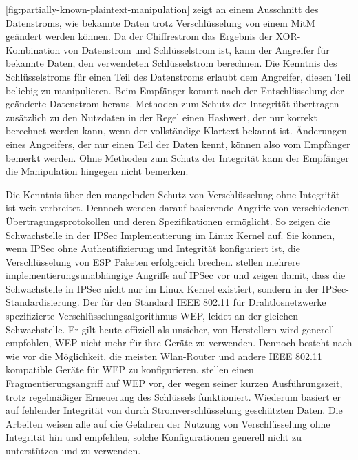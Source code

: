 \autoref{fig:partially-known-plaintext-manipulation} zeigt an einem Ausschnitt des Datenstroms, wie bekannte Daten trotz Verschlüsselung von einem \ac{MitM} geändert werden können. Da der Chiffrestrom das Ergebnis der \ac{XOR}-Kombination von Datenstrom und Schlüsselstrom ist, kann der Angreifer für bekannte Daten, den verwendeten Schlüsselstrom berechnen. Die Kenntnis des Schlüsselstroms für einen Teil des Datenstroms erlaubt dem Angreifer, diesen Teil beliebig zu manipulieren. Beim Empfänger kommt nach der Entschlüsselung der geänderte Datenstrom heraus. Methoden zum Schutz der Integrität übertragen zusätzlich zu den Nutzdaten in der Regel einen Hashwert, der nur korrekt berechnet werden kann, wenn der vollständige Klartext bekannt ist. Änderungen eines Angreifers, der nur einen Teil der Daten kennt, können also vom Empfänger bemerkt werden. Ohne Methoden zum Schutz der Integrität kann der Empfänger die Manipulation hingegen nicht bemerken.

Die Kenntnis über den mangelnden Schutz von Verschlüsselung ohne Integrität ist weit verbreitet. Dennoch werden darauf basierende Angriffe von verschiedenen Übertragungsprotokollen und deren Spezifikationen ermöglicht. So zeigen \citet{paterson2006cryptography} die Schwachstelle in der \ac{IPSec} Implementierung im Linux Kernel auf. Sie können, wenn \ac{IPSec} ohne Authentifizierung und Integrität konfiguriert ist, die Verschlüsselung von \ac{ESP} Paketen erfolgreich brechen. \citet{degabriele2007attacking} stellen mehrere implementierungsunabhängige Angriffe auf \ac{IPSec} vor und zeigen damit, dass die Schwachstelle in \ac{IPSec} nicht nur im Linux Kernel existiert, sondern in der \ac{IPSec}-Standardisierung. Der für den Standard IEEE 802.11 für Drahtlosnetzwerke spezifizierte Verschlüsselungsalgorithmus \ac{WEP}, leidet an der gleichen Schwachstelle. Er gilt heute offiziell als unsicher, von Herstellern wird generell empfohlen, \ac{WEP} nicht mehr für ihre Geräte zu verwenden. Dennoch besteht nach wie vor die Möglichkeit, die meisten Wlan-Router und andere IEEE 802.11 kompatible Geräte für \ac{WEP} zu konfigurieren. \citet{bittau2006final} stellen einen Fragmentierungsangriff auf \ac{WEP} vor, der wegen seiner kurzen Ausführungszeit, trotz regelmäßiger Erneuerung des Schlüssels funktioniert. Wiederum basiert er auf fehlender Integrität von durch Stromverschlüsselung geschützten Daten. Die Arbeiten weisen alle auf die Gefahren der Nutzung von Verschlüsselung ohne Integrität hin und empfehlen, solche Konfigurationen generell nicht zu unterstützen und zu verwenden.

